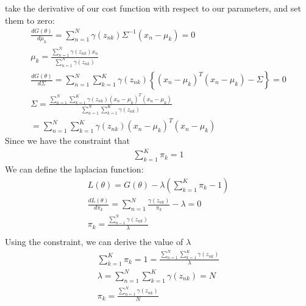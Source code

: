 \documentclass[12pt,twoside]{article}
\begin{document}
take the derivative of our cost function with respect to our parameters, and set them to zero:
\begin{align}
\frac{d G(\theta)}{d \mu_k} = \sum_{n=1}^N  \gamma(z_{nk})\Sigma^{-1}(x_n - \mu_k) = 0 \\
\mu_k = \frac{\sum_{n=1}^N  \gamma(z_{nk}) x_n}{\sum_{n=1}^N  \gamma(z_{nk})}\\
\frac{d G(\theta)}{d \Sigma} = \sum_{n=1}^{N} \sum_{k=1}^{K} \gamma(z_{nk})\left\lbrace (x_n - \mu_k)^T (x_n - \mu_k) - \Sigma \right\rbrace = 0\\
\Sigma = \frac{\sum_{n=1}^{N} \sum_{k=1}^{K} \gamma(z_{nk})(x_n - \mu_k)^T (x_n - \mu_k) }{\sum_{n=1}^{N} \sum_{k=1}^{K} \gamma(z_{nk})} \\
= \sum_{n=1}^{N} \sum_{k=1}^{K} \gamma(z_{nk})(x_n - \mu_k)^T (x_n - \mu_k) 
\end{align}
Since we have the constraint that
\begin{align}
\sum_{k=1}^K \pi_k = 1
\end{align}
We can define the laplacian function:
\begin{align}
L(\theta) = G(\theta) - \lambda (\sum_{k=1}^K \pi_k - 1) \\
\frac{d L(\theta)}{d \pi_k} = \sum_{n=1}^N \frac{\gamma(z_{nk})}{\pi_k} - \lambda = 0\\
\pi_k = \frac{\sum_{n-1}^N \gamma(z_{nk})}{\lambda}\\
\end{align}
Using the constraint, we can derive the value of $\lambda$
\begin{align}
\sum_{k=1}^K \pi_k = 1 = \frac{\sum_{n=1}^{N} \sum_{k=1}^{K} \gamma(z_{nk}) }{\lambda}\\
\lambda = \sum_{n=1}^{N} \sum_{k=1}^{K} \gamma(z_{nk}) = N\\
\pi_k = \frac{\sum_{n=1}^{N} \gamma(z_{nk})}{N}
\end{align}
\end{document}
